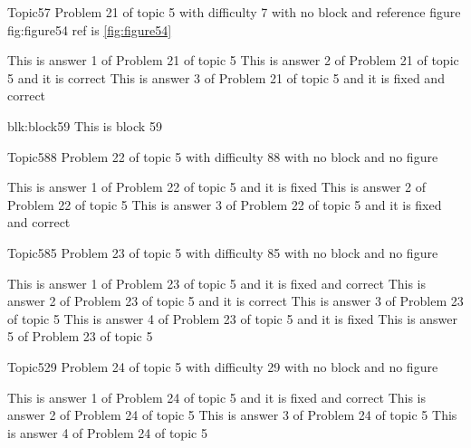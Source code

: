 \documentclass[master]{exam}
\begin{document}
\begin{problem}{Topic5}{7}
	Problem 21 of topic 5 with difficulty 7 with no block and reference figure fig:figure54 ref is \ref{fig:figure54}
	\begin{answers}
		\answer This is answer 1 of Problem 21 of topic 5 
		\answer[correct] This is answer 2 of Problem 21 of topic 5 and it is correct
		 This is answer 3 of Problem 21 of topic 5 and it is fixed and correct
	\end{answers}
\end{problem}



\begin{block}{blk:block59}
This is block 59
\end{block}


\begin{problem}{Topic5}{88}
	Problem 22 of topic 5 with difficulty 88 with no block and no figure
	\begin{answers}
		\answer[fixed] This is answer 1 of Problem 22 of topic 5 and it is fixed
		\answer This is answer 2 of Problem 22 of topic 5 
		 This is answer 3 of Problem 22 of topic 5 and it is fixed and correct
	\end{answers}
\end{problem}

\begin{problem}{Topic5}{85}
	Problem 23 of topic 5 with difficulty 85 with no block and no figure
	\begin{answers}
		 This is answer 1 of Problem 23 of topic 5 and it is fixed and correct
		\answer[correct] This is answer 2 of Problem 23 of topic 5 and it is correct
		\answer This is answer 3 of Problem 23 of topic 5 
		\answer[fixed] This is answer 4 of Problem 23 of topic 5 and it is fixed
		\answer This is answer 5 of Problem 23 of topic 5 
	\end{answers}
\end{problem}

\begin{problem}{Topic5}{29}
	Problem 24 of topic 5 with difficulty 29 with no block and no figure
	\begin{answers}
		 This is answer 1 of Problem 24 of topic 5 and it is fixed and correct
		\answer This is answer 2 of Problem 24 of topic 5 
		\answer This is answer 3 of Problem 24 of topic 5 
		\answer This is answer 4 of Problem 24 of topic 5 
	\end{answers}
\end{problem}
\end{document}
